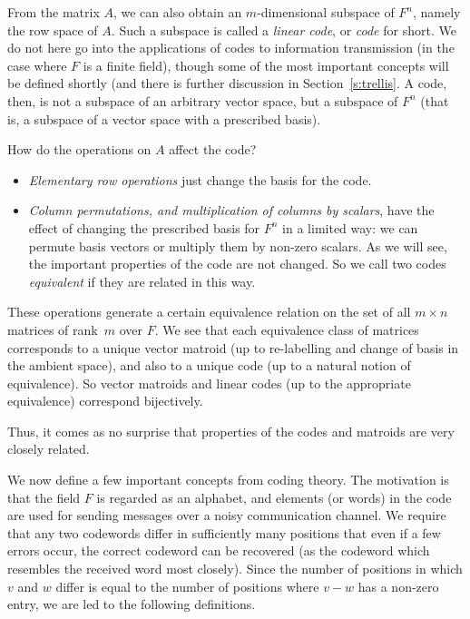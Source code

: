 \documentclass[12pt]{article}
\begin{document}
From the matrix $A$, we can also obtain an $m$-dimensional subspace
of $F^n$, namely the row space of $A$. Such a subspace is called
a \emph{linear code}, or \emph{code} for short. We do not here go
into the applications of codes to information transmission (in
the case where $F$ is a finite field), though some of the most
important concepts will be defined shortly (and there is further
discussion in Section~\ref{s:trellis}. A code, then, is not
a subspace of an arbitrary vector space, but a subspace of $F^n$
(that is, a subspace of a vector space with a prescribed basis).

How do the operations on $A$ affect the code?
\begin{itemize}
\item\emph{Elementary row operations} just change the basis for
the code.
\item\emph{Column permutations, and multiplication of columns by
scalars}, have the effect of changing the prescribed basis for
$F^n$ in a limited way: we can permute basis vectors or multiply
them by non-zero scalars. As we will see, the important properties
of the code are not changed. So we call two codes \emph{equivalent}
if they are related in this way.
\end{itemize}

These operations generate a certain equivalence relation on the
set of all $m\times n$ matrices of rank~$m$ over $F$. We see that
each equivalence class of matrices corresponds to a unique vector
matroid (up to re-labelling and change of basis in the ambient
space), and also to a unique code (up to a natural notion of
equivalence). So vector matroids and linear codes (up to the
appropriate equivalence) correspond bijectively.

Thus, it comes as no surprise that properties of the codes and
matroids are very closely related.

\medbreak

We now define a few important concepts from coding theory. The
motivation is that the field $F$ is regarded as an alphabet, and
elements (or words) in the code are used for sending messages
over a noisy communication channel. We require that any two
codewords differ in sufficiently many positions that even if a
few errors occur, the correct codeword can be recovered (as the
codeword which resembles the received word most closely). Since
the number of positions in which $v$ and $w$ differ is equal to
the number of positions where $v-w$ has a non-zero entry, we
are led to the following definitions.
\end{document}

